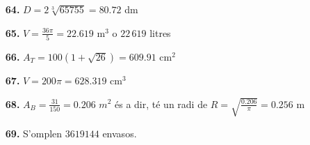 \documentclass[a4paper, pdf, twoside]{book}
\begin{document}
\begin{multicols}{2}
\begin{enumerate}
\vspace{0.25cm}
\item[\fontfamily{phv}\selectfont\color{blue}\textbf{64. }] 
$D=2\sqrt [3]{65755}=80.72$ dm
\vspace{0.25cm}
\item[\fontfamily{phv}\selectfont\color{blue}\textbf{65. }] 
$V=\frac {36\pi }{5}=22.619$ m$^3$ o $22\,619$ litres
\vspace{0.25cm}
\item[\fontfamily{phv}\selectfont\color{blue}\textbf{66. }] 
$A_T=100(1+\sqrt {26})=609.91$ cm$^2$
\vspace{0.25cm}
\item[\fontfamily{phv}\selectfont\color{blue}\textbf{67. }] 
$V=200\pi =628.319$ cm$^3$
\vspace{0.25cm}
\item[\fontfamily{phv}\selectfont\color{blue}\textbf{68. }] 
$A_B=\frac {31}{150}=0.206$ $m^2$ és a dir, té un radi de $R=\sqrt {\frac {0.206}{\pi }}=0.256$ m
\vspace{0.25cm}
\item[\fontfamily{phv}\selectfont\color{blue}\textbf{69. }] 
S'omplen $3 619 144$ envasos.
 \end{enumerate}
\vspace{0.3cm}



\end{multicols}
\end{document}
